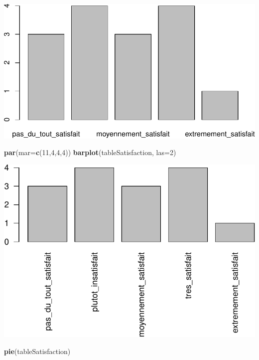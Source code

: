 \documentclass[
]{book}
\newenvironment{Shaded}{\begin{snugshade}}{\end{snugshade}}
\newcommand{\AttributeTok}[1]{\textcolor[rgb]{0.13,0.29,0.53}{#1}}
\newcommand{\DecValTok}[1]{\textcolor[rgb]{0.00,0.00,0.81}{#1}}
\newcommand{\FunctionTok}[1]{\textcolor[rgb]{0.13,0.29,0.53}{\textbf{#1}}}
\newcommand{\NormalTok}[1]{#1}
\begin{document}
\includegraphics{_main_files/figure-latex/unnamed-chunk-53-2.pdf}

\begin{Shaded}
\begin{Highlighting}[]
\FunctionTok{par}\NormalTok{(}\AttributeTok{mar=}\FunctionTok{c}\NormalTok{(}\DecValTok{11}\NormalTok{,}\DecValTok{4}\NormalTok{,}\DecValTok{4}\NormalTok{,}\DecValTok{4}\NormalTok{))}
\FunctionTok{barplot}\NormalTok{(tableSatisfaction, }\AttributeTok{las=}\DecValTok{2}\NormalTok{)}
\end{Highlighting}
\end{Shaded}

\includegraphics{_main_files/figure-latex/unnamed-chunk-53-3.pdf}

\begin{Shaded}
\begin{Highlighting}[]
\FunctionTok{pie}\NormalTok{(tableSatisfaction)}
\end{Highlighting}
\end{Shaded}
\end{document}
